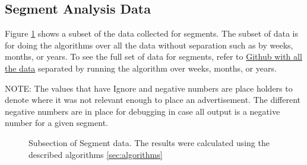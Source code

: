\documentclass[titlepage,twocolumn]{article}
\begin{document}
\clearpage

\subsection{Segment Analysis Data}
\label{seg:segmentAnalysisData}
\par Figure \ref{tab:tableSegmentSub} shows a subset of the data collected for segments. The subset of data is for doing the algorithms over all the data without separation such as by weeks, months, or years. To see the full set of data for segments, refer to \href{https://github.com/gateslm/CSSE-Senior-Thesis/blob/master/Results/finalResultSegment.xlsx}{Github with all the data} separated by running the algorithm over weeks, months, or years.


\par NOTE: The values that have Ignore and negative numbers are place holders to denote where it was not relevant enough to place an advertisement. The different negative numbers are in place for debugging in case all output is a negative number for  a given segment.

\begin{figure}[htbp]
	\centering
  
  \label{tab:tableSegmentSub}%
\caption{Subsection of Segment data. The results were calculated using the described algorithms \ref{sec:algorithms} }
\end{figure}%


\clearpage
\twocolumn
\end{document}
